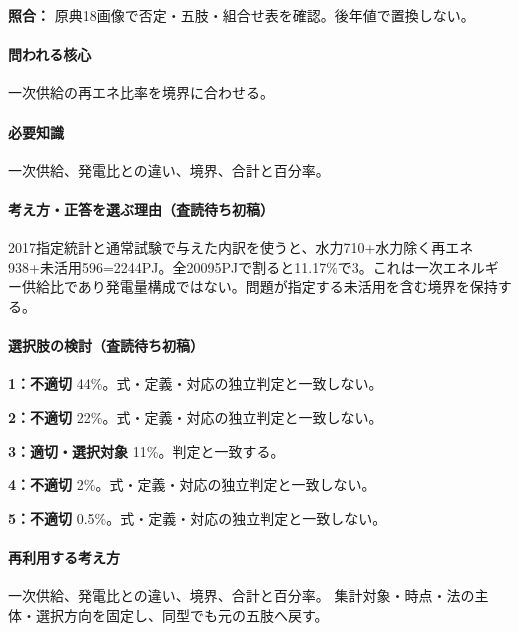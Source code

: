 \noindent\textbf{照合：} 原典18画像で否定・五肢・組合せ表を確認。後年値で置換しない。\par

\paragraph{問われる核心} 一次供給の再エネ比率を境界に合わせる。

\paragraph{必要知識} 一次供給、発電比との違い、境界、合計と百分率。

\paragraph{考え方・正答を選ぶ理由（査読待ち初稿）} 2017指定統計と通常試験で与えた内訳を使うと、水力710+水力除く再エネ938+未活用596=\allowbreak{}2244PJ。全20095PJで割ると11.17\%で3。これは一次エネルギー供給比であり発電量構成ではない。問題が指定する未活用を含む境界を保持する。

\paragraph{選択肢の検討（査読待ち初稿）}\mbox{}\par

\noindent\textbf{1：不適切} 44\%。式・定義・対応の独立判定と一致しない。\par

\noindent\textbf{2：不適切} 22\%。式・定義・対応の独立判定と一致しない。\par

\noindent\textbf{3：適切・選択対象} 11\%。判定と一致する。\par

\noindent\textbf{4：不適切} 2\%。式・定義・対応の独立判定と一致しない。\par

\noindent\textbf{5：不適切} 0.5\%。式・定義・対応の独立判定と一致しない。\par

\paragraph{再利用する考え方} 一次供給、発電比との違い、境界、合計と百分率。 集計対象・時点・法の主体・選択方向を固定し、同型でも元の五肢へ戻す。

